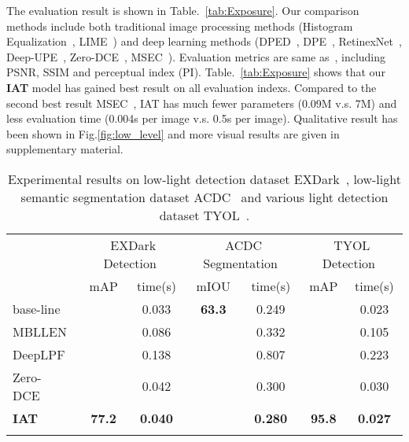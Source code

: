 \documentclass{bmvc2k}
\begin{document}
The evaluation result is shown in Table.~\ref{tab:Exposure}. Our comparison methods include both traditional image processing methods (Histogram Equalization~\cite{DIP}, LIME~\cite{LIME}) and deep learning methods (DPED~\cite{DPED}, DPE~\cite{DPE_CVPR18}, RetinexNet~\cite{LOL_dataset}, Deep-UPE~\cite{DeepUPE_2019_CVPR}, Zero-DCE~\cite{zero_dce}, MSEC~\cite{Exposure_2021_CVPR}). Evaluation metrics are same as~\cite{Exposure_2021_CVPR}, including PSNR, SSIM and perceptual index (PI). Table.~\ref{tab:Exposure} shows that our \textbf{IAT} model has gained best result on all evaluation indexs. Compared to the second best result MSEC~\cite{Exposure_2021_CVPR},  IAT has much fewer parameters (0.09M v.s. 7M) and less evaluation time (0.004s per image v.s. 0.5s per image). Qualitative result has been shown in Fig.\ref{fig:low_level} and more visual results are given in supplementary material.   

\begin{table}[t]
\caption{Experimental results on low-light detection dataset EXDark~\cite{EXDark}, low-light semantic segmentation dataset ACDC~\cite{ACDC} and various light  detection dataset TYOL~\cite{Toyota_light}.}
\centering
\setlength\tabcolsep{2pt}
\begin{adjustbox}{max width = 0.95\linewidth}
\begin{tabular}{l|cc|cc|cc}
\Xhline{1.0pt}
\multirow{2}{*}{Methods} & \multicolumn{2}{c|}{ EXDark Detection~\cite{EXDark}} & \multicolumn{2}{c|}{ ACDC Segmentation~\cite{ACDC}} & \multicolumn{2}{c}{ TYOL Detection~\cite{Toyota_light}} \\ \cline{2-7}  & \qquad mAP & time(s)  & \qquad mIOU  & time(s)  & \qquad mAP   & time(s) \\ \Xhline{0.6pt}
base-line  & \qquad 76.4  & 0.033  & \qquad \textbf{63.3}   & 0.249    & \qquad 88.4    & 0.023               \\ 
MBLLEN~\cite{Lv2018MBLLEN}     & \qquad 76.3    & 0.086     & \qquad 63.0   & 0.332  & \qquad 95.3             & 0.105               \\ 
DeepLPF~\cite{Deep_LPF}                  & \qquad 76.3              & 0.138                 & \qquad 61.9               & 0.807                 & \qquad 94.5             & 0.223               \\ 
Zero-DCE~\cite{zero_dce}                 & \qquad 76.9             & 0.042                 & \qquad 61.9               & 0.300                 & \qquad 95.2             & 0.030               \\ 
\textbf{IAT}                      & \qquad \textbf{77.2}              & \textbf{0.040}                 & \qquad 62.1              & \textbf{0.280 }                & \qquad \textbf{95.8}     & \textbf{0.027}       \\ \Xhline{1.0pt}
\end{tabular}
\end{adjustbox}
\label{tab:high}
\end{table}
\end{document}
